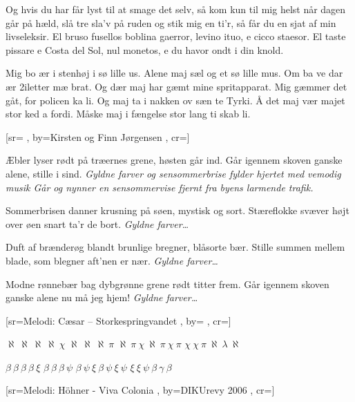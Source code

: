 \documentclass[pdftex,12pt]{article}
\begin{document}
\begin{songs}{}
\beginverse
Og hvis du har får lyst til at smage det selv,
så kom kun til mig helst når dagen går på hæld,
slå tre sla’v på ruden og stik mig en ti’r,
så får du en sjat af min livseleksir.
El bruso fusellos boblina gaerror,
levino ituo, e cicco staesor.
El taste pissare e Costa del Sol,
nul monetos, e du havor ondt i din knold.
\endverse

\beginverse
Mig bo ær i stenhøj i sø lille us.
Alene maj sæl og et sø lille mus.
Om ba ve dar ær 2iletter mæ brat.
Og dær maj har gæmt mine spritapparat.
Mig gæmmer det gåt, for policen ka li.
Og maj ta i nakken ov sæn te Tyrki.
Å det maj vær majet stor ked a fordi.
Måske maj i fængelse stor lang ti skab li.
\endverse
\endsong



﻿[sr={}
,
by={Kirsten og Finn Jørgensen}
,
cr={}]\hypertarget{Sensommervisen}{}
\label{song56}

\beginverse
Æbler lyser rødt på træernes grene,
høsten går ind.
Går igennem skoven ganske alene,
stille i sind.
\emph{Gyldne farver og sensommerbrise
fylder hjertet med vemodig musik
Går og nynner en sensommervise
fjernt fra byens larmende trafik.}
\endverse

\beginverse
Sommerbrisen danner krusning på søen,
mystisk og sort.
Stæreflokke svæver højt over øen
snart ta'r de bort.
\emph{Gyldne farver\ldots}
\endverse

\beginverse
Duft af brænderøg blandt brunlige bregner,
blåsorte bær.
Stille summen mellem blade, som blegner
aft'nen er nær.
\emph{Gyldne farver\ldots}
\endverse

\beginverse
Modne rønnebær bag dybgrønne grene
rødt titter frem.
Går igennem skoven ganske alene
nu må jeg hjem!
\emph{Gyldne farver\ldots}
\endverse
\endsong



﻿[sr={Melodi: Cæsar -- Storkespringvandet}
,
by={}
,
cr={}]\hypertarget{Sortsnak}{}
\label{song57}

\beginverse
\large
$\aleph\ \aleph\ \aleph\ \aleph\ \chi$
$\aleph\ \aleph\ \aleph\ \pi$
$\aleph\ \pi\ \chi\ \aleph\ \pi\ \chi\ \pi$
$\chi\ \chi\ \pi\ \aleph\ \lambda\ \aleph$

\endverse
{}
\large
$\beta\ \beta\ \beta\ \beta\ \xi$
$\beta\ \beta\ \beta\ \psi$
$\beta\ \psi\ \xi\ \beta\ \psi\ \xi\ \psi$
$\xi\ \xi\ \psi\ \beta\ \gamma\ \beta$

\endverse
\endsong


﻿[sr={Melodi: Höhner - Viva Colonia}
,
by={DIKUrevy 2006}
,
cr={}]\hypertarget{Så spiller vi spil}{}
\label{song58}


\end{songs}
\end{document}
